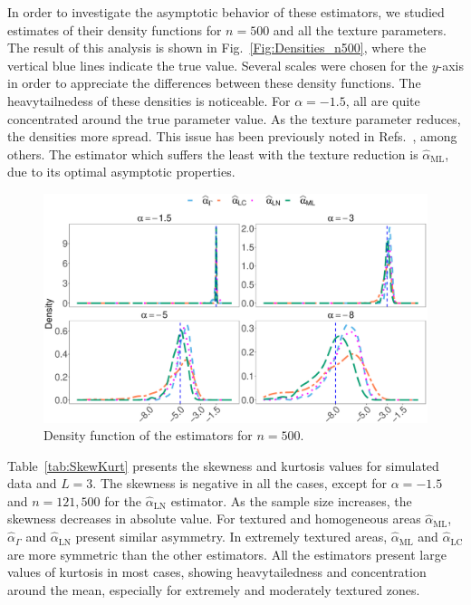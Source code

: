 \documentclass[twocolumn]{svjour3}
\begin{document}
In order to investigate the asymptotic behavior of these estimators, we studied estimates of their density functions for $n=500$ and all the texture parameters. 
The result of this analysis is shown in Fig.~\ref{Fig:Densities_n500}, where
the vertical blue lines indicate the true value. 
Several scales were chosen for the $y$-axis in order to appreciate the differences between these density functions. 
The heavytailnedess of these densities is noticeable.
For $\alpha=-1.5$, all are quite concentrated around the true parameter value. 
As the texture parameter reduces, the densities more spread.
This issue has been previously noted in Refs.~\cite{APSAR2013ParameterEstimationStochasticDistances,CribariFrerySilva:CSDA,AllendeFreryetal:JSCS:05,FreryCribariSouza:JASP:04}, among others.
The estimator which suffers the least with the texture reduction is $\widehat{\alpha}_{\text{{ML}}}$, due to its optimal asymptotic properties.      

\begin{figure}[hbt]
	\centering
	\includegraphics[width=1\linewidth]{../../../Figures/PaperTesis/Asymptotic_n500_TodoAlfa.eps}
	\caption{\label{Fig:Densities_n500} Density function of the estimators for $n=500$. }\label{Fig:DistEstimator}
\end{figure}

Table~\ref{tab:SkewKurt} presents the skewness and kurtosis values for simulated data and $L=3$. 
The skewness is negative in all the cases, except for $\alpha=-1.5$ and $n=121,500$ for the $\widehat{\alpha}_{\text{{LN}}}$ estimator. 
As the sample size increases, the skewness decreases in absolute value. 
For textured and homogeneous areas $\widehat{\alpha}_{\text{{ML}}}$, $\widehat{\alpha}_{\Gamma}$ and $\widehat{\alpha}_{\text{{LN}}}$ present similar asymmetry. 
In extremely textured areas, $\widehat{\alpha}_{\text{{ML}}}$ and $\widehat{\alpha}_{\text{{LC}}}$ are more symmetric than the other estimators.
All the estimators present large values of kurtosis in most cases, showing heavytailedness and concentration around the mean, especially for extremely and moderately textured zones.
\end{document}
